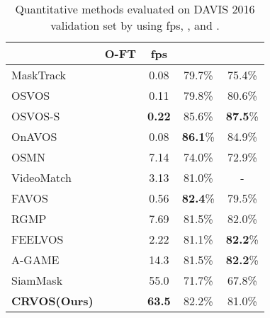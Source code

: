 \documentclass{article}
\begin{document}
\begin{table}[t]
	\centering
	\begin{tabular}{l|c c c c}
											 & O-FT   	  & fps 	      &  &  \\ \midrule
	MaskTrack \cite{perazzi2017learning} 	 & \checkmark & 0.08 		  & 79.7\% 				  & 75.4\%				  \\
	OSVOS \cite{caelles2017one} 			 & \checkmark & 0.11 		  & 79.8\% 				  & 80.6\% 				  \\
	OSVOS-S \cite{maninis2018video} 		 & \checkmark & \textbf{0.22} & 85.6\% 				  & \textbf{87.5}\% 	  \\
	OnAVOS \cite{voigtlaender2017online} 	 & \checkmark & 0.08 		  & \textbf{86.1}\%  	  & 84.9\%				  \\ \midrule
 	OSMN \cite{yang2018efficient} 			 & 			  & 7.14     	  & 74.0\%  			  & 72.9\%				  \\
	VideoMatch \cite{hu2018videomatch}  	 &   		  & 3.13   		  & 81.0\%  			  & -   				  \\
	FAVOS \cite{cheng2018fast} 			     & 			  & 0.56   		  & \textbf{82.4}\% 	  & 79.5\%  			  \\
	RGMP \cite{wug2018fast} 			     &    	      & 7.69   	      & 81.5\%   		      & 82.0\%  			  \\
	FEELVOS \cite{voigtlaender2019feelvos}   &  		  & 2.22 		  & 81.1\%   			  & \textbf{82.2}\%  	  \\
	A-GAME \cite{johnander2019generative}  	 &   		  & 14.3   	      & 81.5\%   	   	   	  & \textbf{82.2}\%  	  \\
	SiamMask \cite{wang2019fast}  	         &   	      & 55.0   	      & 71.7\%     	   	      & 67.8\%    	          \\
	\textbf{CRVOS(Ours)}    	  	   	     &     	      & \textbf{63.5} & 82.2\%     	          & 81.0\%                \\
	\end{tabular}
	\caption{Quantitative methods evaluated on DAVIS 2016 validation set by using fps, , and .}
	\label{results table 16}
\end{table}
\end{document}
